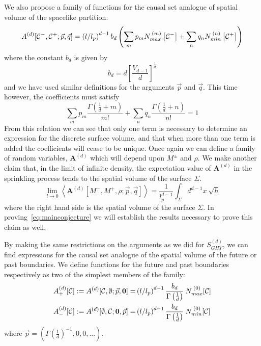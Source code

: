 \documentclass[12pt]{article}
\newcommand{\be}{\begin{equation}}
\newcommand{\ee}{\end{equation}}
\begin{document}
We also propose a family of functions for the causal set analogue of spatial volume of the spacelike partition:
\be\label{general_area_sum}
A^{ (d)}[\mathcal{C}^-,\mathcal{C}^+;\vec{p},\vec{q}]=\left (l/l_p\right)^{d-1}b_{d}\left (\sum_m p_m N_{\vphantom{i}max}^{\: (m)}\left[\mathcal{C}^- \right] + \sum_n q_n N_{min}^{\: (n)}\left[\mathcal{C}^+ \right]\right)
\ee
where the constant $b_d$ is given by
\be\label{constant_b_d}
b_d=d\left[\frac{V_{d-1}}{d}\right]^{\frac{1}{d}}
\ee
and we have used similar definitions for the arguments $\vec{p}$ and $\vec{q}$. This time however, the coefficients must satisfy 
\be\label{area_coefficient_relation}
\sum_m p_m \frac{\Gamma\left (\frac{1}{d}+m \right)}{m!}  + \sum_n q_n\frac{\Gamma\left (\frac{1}{d}+n \right)}{n!}=1
\ee
From this relation we can see that only one term is necessary to determine an expression for the discrete surface volume, and that when more than one term is added the coefficients will cease to be unique. Once again we can define a family of random variables, $\textbf{A}^{ (d)}$ which will depend upon $M^{\pm}$ and $\rho$. We make another claim that, in the limit of infinite density, the expectation value of $\textbf{A}^{ (d)}$ in the sprinkling process tends to the spatial volume of the surface $\Sigma$.
\be\label{eq:conjecture_for_area}
\lim_{l\rightarrow0}\left\langle\textbf{A}^{ (d)}[M^-,M^+,\rho;\vec{p} , \vec{q}]\right\rangle= \frac{1}{l_p^{d-1}}\int_{\Sigma} d^{d-1}x\: \sqrt{h}
\ee
where the right hand side is the spatial volume of the surface $\Sigma$. In proving~\eqref{eq:mainconjecture} we will establish the results necessary to prove this claim as well.

By making the same restrictions on the arguments as we did for $S^{ (d)}_{GHY}$, we can find expressions for the causal set analogue of the spatial volume of the future or past boundaries. We define functions for the future and past boundaries respectively as two of the simplest members of the family:
\begin{align}\label{eq:future_past_spatial_volume}
A^{ (d)}_{+}[\mathcal{C}]:=A^{ (d)}[\mathcal{C},\emptyset;\vec{p},\mathbf{0}]= & \left (l/l_p\right)^{d-1}\frac{b_{d}}{\Gamma\left (\frac{1}{d}\right)}\: N_{\vphantom{i}max}^{\: (0)}[\mathcal{C}]
\\
A^{ (d)}_{-}[\mathcal{C}]:=A^{ (d)}[\emptyset,\mathcal{C};\mathbf{0},\vec{p}]= & \left (l/l_p\right)^{d-1}\frac{b_{d}}{\Gamma\left (\frac{1}{d}\right)}\: N_{min}^{\: (0)}[\mathcal{C}]
\end{align}
where $\vec{p}= (\Gamma\left (\frac{1}{d}\right)^{-1},0,0,...)$.
\end{document}

